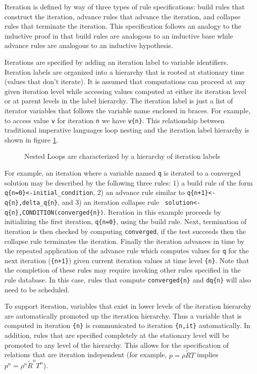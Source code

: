 \documentclass[10pt,epsf]{book}
\begin{document}
Iteration is defined by way of three types of rule specifications:
build rules that construct the iteration, advance rules that advance
the iteration, and collapse rules that terminate the iteration.  This
specification follows an analogy to the inductive proof in that build
rules are analogous to an inductive base while advance rules are
analogous to an inductive hypothesis.


Iterations are specified by adding an iteration label to variable
identifiers.  Iteration labels are organized into a hierarchy that is
rooted at stationary time (values that don't iterate).  It is assumed
that computations can proceed at any given iteration level while
accessing values computed at either its iteration level or at parent
levels in the label hierarchy.  The iteration label is just a list of
iterator variables that follows the variable name enclosed in braces.
For example, to access value {\tt v} for iteration {\tt n} we have 
{\tt v\{n\}}.  This relationship between traditional imperative languages
loop nesting and the iteration label hierarchy is shown in figure
\ref{fig:nested}. 

\begin{figure}[h]
\centerline{
\epsfxsize=3.4in
}
\caption{Nested Loops are characterized by a hierarchy of iteration labels}
\label{fig:nested}
\end{figure}

For example, an iteration where a variable named {\tt q} is iterated
to a converged solution may be described by the following three rules:
1) a build rule of the form {\tt q\{n=0\}<-initial\_condition}, 2) an
advance rule similar to {\tt q\{n+1\}<-q\{n\},delta\_q\{n\}}, and 3)
an iteration collapse rule {\tt
  solution<-q\{n\},CONDITION(converged\{n\})}.  Iteration in this
example proceeds by initializing the first iteration, {\tt q\{n=0\}},
using the build rule.  Next, termination of iteration is then checked
by computing {\tt converged}, if the test succeeds then the collapse
rule terminates the iteration.  Finally the iteration advances in time
by the repeated application of the advance rule which computes values
for {\tt q} for the next iteration ({\tt\{n+1\}}) given current
iteration values at time level {\tt\{n\}}.  Note that the completion
of these rules may require invoking other rules specified in the rule
database.  In this case, rules that compute {\tt converged\{n\}} and
{\tt dq\{n\}} will also need to be scheduled.

To support iteration, variables that exist in lower levels of the
iteration hierarchy are automatically promoted up the iteration
hierarchy.  Thus a variable that is computed in iteration {\tt\{n\}}
is communicated to iteration {\tt\{n,it\}} automatically.  In
addition, rules that are specified completely at the stationary level
will be promoted to any level of the hierarchy.  This allows for the
specification of relations that are iteration independent (for
example, $p = \rho \tilde{R} T$ implies $p^n = \rho^n \tilde{R}^n
T^n$).
\end{document}
